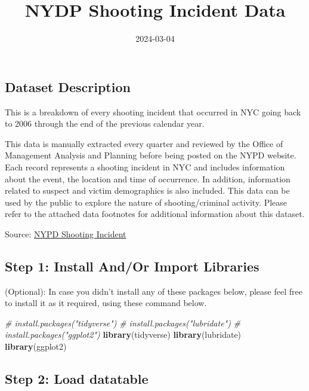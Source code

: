 \documentclass[
]{article}
\title{NYDP Shooting Incident Data}
\author{}
\date{\vspace{-2.5em}2024-03-04}
\newenvironment{Shaded}{\begin{snugshade}}{\end{snugshade}}
\newcommand{\CommentTok}[1]{\textcolor[rgb]{0.56,0.35,0.01}{\textit{#1}}}
\newcommand{\FunctionTok}[1]{\textcolor[rgb]{0.13,0.29,0.53}{\textbf{#1}}}
\newcommand{\NormalTok}[1]{#1}
\begin{document}
\maketitle

\hypertarget{dataset-description}{%
\subsection{Dataset Description}\label{dataset-description}}

This is a breakdown of every shooting incident that occurred in NYC
going back to 2006 through the end of the previous calendar year.

This data is manually extracted every quarter and reviewed by the Office
of Management Analysis and Planning before being posted on the NYPD
website. Each record represents a shooting incident in NYC and includes
information about the event, the location and time of occurrence. In
addition, information related to suspect and victim demographics is also
included. This data can be used by the public to explore the nature of
shooting/criminal activity. Please refer to the attached data footnotes
for additional information about this dataset.

Source:
\href{httpds://catalog.data.gov/dataset/nypd-shooting-incident-data-historic}{NYPD
Shooting Incident}

\hypertarget{step-1-install-andor-import-libraries}{%
\subsection{Step 1: Install And/Or Import
Libraries}\label{step-1-install-andor-import-libraries}}

(Optional): In case you didn't install any of these packages below,
please feel free to install it as it required, using these command
below.

\begin{Shaded}
\begin{Highlighting}[]
\CommentTok{\# install.packages("tidyverse")}
\CommentTok{\# install.packages("lubridate")}
\CommentTok{\# install.packages("ggplot2")}
\FunctionTok{library}\NormalTok{(tidyverse)}
\FunctionTok{library}\NormalTok{(lubridate)}
\FunctionTok{library}\NormalTok{(ggplot2)}
\end{Highlighting}
\end{Shaded}

\hypertarget{step-2-load-datatable}{%
\subsection{Step 2: Load datatable}\label{step-2-load-datatable}}
\end{document}
